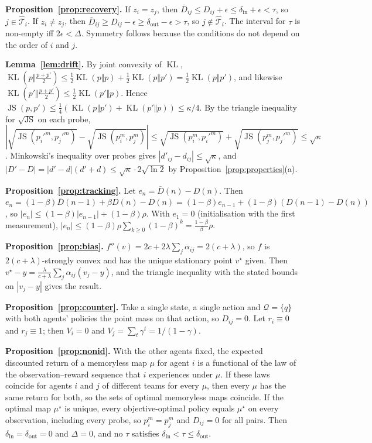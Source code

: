 \documentclass{article}
\theoremstyle{remark}
\newcommand{\JS}{\operatorname{JS}}
\newcommand{\KL}{\operatorname{KL}}
\begin{document}
\textbf{Proposition~\ref{prop:recovery}.} If $z_i=z_j$, then $\bar D_{ij}\le D_{ij}+\epsilon\le\delta_{\mathrm{in}}+\epsilon<\tau$, so
$j\in\hat{\mathcal{T}}_i$. If $z_i\ne z_j$, then $\bar D_{ij}\ge D_{ij}-\epsilon\ge\delta_{\mathrm{out}}-\epsilon>\tau$, so
$j\notin\hat{\mathcal{T}}_i$. The interval for $\tau$ is non-empty iff $2\epsilon<\Delta$. Symmetry follows because the conditions do not
depend on the order of $i$ and $j$.

\textbf{Lemma~\ref{lem:drift}.} By joint convexity of $\KL$, $\KL(p\Vert\frac{p+p'}{2})\le\frac12\KL(p\Vert p)+\frac12\KL(p\Vert p')=\frac12\KL(p\Vert p')$,
and likewise $\KL(p'\Vert\frac{p+p'}{2})\le\frac12\KL(p'\Vert p)$. Hence $\JS(p,p')\le\frac14(\KL(p\Vert p')+\KL(p'\Vert p))\le\kappa/4$. By the
triangle inequality for $\sqrt{\JS}$ on each probe,
$|\sqrt{\JS(p_i'^m,p_j'^m)}-\sqrt{\JS(p_i^m,p_j^m)}|\le\sqrt{\JS(p_i^m,p_i'^m)}+\sqrt{\JS(p_j^m,p_j'^m)}\le\sqrt{\kappa}$. Minkowski's
inequality over probes gives $|d'_{ij}-d_{ij}|\le\sqrt{\kappa}$, and $|D'-D|=|d'-d|(d'+d)\le\sqrt{\kappa}\cdot2\sqrt{\ln 2}$ by
Proposition~\ref{prop:properties}(a).

\textbf{Proposition~\ref{prop:tracking}.} Let $e_n=\bar D(n)-D(n)$. Then $e_n=(1-\beta)\bar D(n-1)+\beta D(n)-D(n)=(1-\beta)e_{n-1}+(1-\beta)(D(n-1)-D(n))$,
so $|e_n|\le(1-\beta)|e_{n-1}|+(1-\beta)\rho$. With $e_1=0$ (initialisation with the first measurement),
$|e_n|\le(1-\beta)\rho\sum_{k\ge0}(1-\beta)^k=\frac{1-\beta}{\beta}\rho$.

\textbf{Proposition~\ref{prop:bias}.} $f''(v)=2c+2\lambda\sum_j\alpha_{ij}=2(c+\lambda)$, so $f$ is $2(c+\lambda)$-strongly convex and has the
unique stationary point $v^\star$ given. Then $v^\star-y=\frac{\lambda}{c+\lambda}\sum_j\alpha_{ij}(v_j-y)$, and the triangle inequality with the
stated bounds on $|v_j-y|$ gives the result.

\textbf{Proposition~\ref{prop:counter}.} Take a single state, a single action and $\mathcal{Q}=\{q\}$ with both agents' policies the point mass on that
action, so $D_{ij}=0$. Let $r_i\equiv0$ and $r_j\equiv1$; then $V_i=0$ and $V_j=\sum_t\gamma^t=1/(1-\gamma)$.

\textbf{Proposition~\ref{prop:nonid}.} With the other agents fixed, the expected discounted return of a memoryless map $\mu$ for agent $i$ is a
functional of the law of the observation--reward sequence that $i$ experiences under $\mu$. If these laws coincide for agents $i$ and $j$ of
different teams for every $\mu$, then every $\mu$ has the same return for both, so the sets of optimal memoryless maps coincide. If the optimal
map $\mu^\star$ is unique, every objective-optimal policy equals $\mu^\star$ on every observation, including every probe, so $p_i^m=p_j^m$ and
$D_{ij}=0$ for all pairs. Then $\delta_{\mathrm{in}}=\delta_{\mathrm{out}}=0$ and $\Delta=0$, and no $\tau$ satisfies
$\delta_{\mathrm{in}}<\tau\le\delta_{\mathrm{out}}$.
\end{document}
